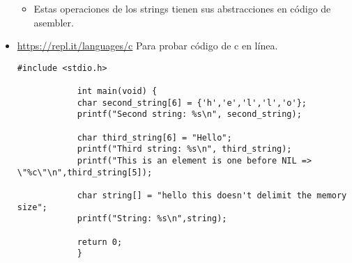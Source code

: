 \begin{itemize}
\begin{itemize}
            \item Estas operaciones de los strings tienen sus abstracciones en código de asembler.
        \end{itemize}
        
    
    \item \url{https://repl.it/languages/c} Para probar código de c en línea.
        \begin{Verbatim}[breaklines=true, breakanywhere=true]
            #include <stdio.h>

            int main(void) {
            char second_string[6] = {'h','e','l','l','o'};
            printf("Second string: %s\n", second_string);

            char third_string[6] = "Hello";
            printf("Third string: %s\n", third_string);
            printf("This is an element is one before NIL => \"%c\"\n",third_string[5]);

            char string[] = "hello this doesn't delimit the memory size";
            printf("String: %s\n",string);
            
            return 0;
            }
        \end{Verbatim}
\end{itemize}

